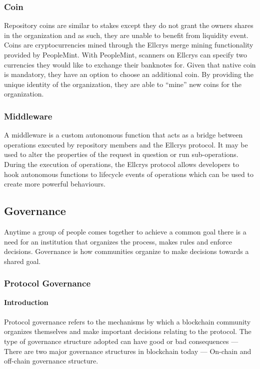 \subsubsection{Coin}
Repository coins are similar to stakes except they do not grant the owners shares in the organization and as such, they are unable to benefit from liquidity event. Coins are cryptocurrencies mined through the Ellcrys merge mining functionality provided by PeopleMint. With PeopleMint, scanners on Ellcrys can specify two currencies they would like to exchange their banknotes for. Given that native coin is mandatory, they have an option to choose an additional coin. By providing the unique identity of the organization, they are able to “mine” new coins for the organization.

\subsubsection{Middleware}
A middleware is a custom autonomous function that acts as a bridge between operations executed by repository members and the Ellcrys protocol. It may be used to alter the properties of the request in question or run sub-operations. During the execution of operations, the Ellcrys protocol allows developers to hook autonomous functions to lifecycle events of operations which can be used to create more powerful behaviours.

\subsection{Governance}
Anytime a group of people comes together to achieve a common goal there is a need for an institution that organizes the process, makes rules and enforce decisions. Governance is how communities organize to make decisions towards a shared goal.


\subsubsection{Protocol Governance}
\vspace{5mm}
\textbf{Introduction}\\\\
Protocol governance refers to the mechanisms by which a blockchain community organizes themselves and make important decisions relating to the protocol. The type of governance structure adopted can have good or bad consequences — There are two major governance structures in blockchain today — On-chain and off-chain governance structure.\\\\


